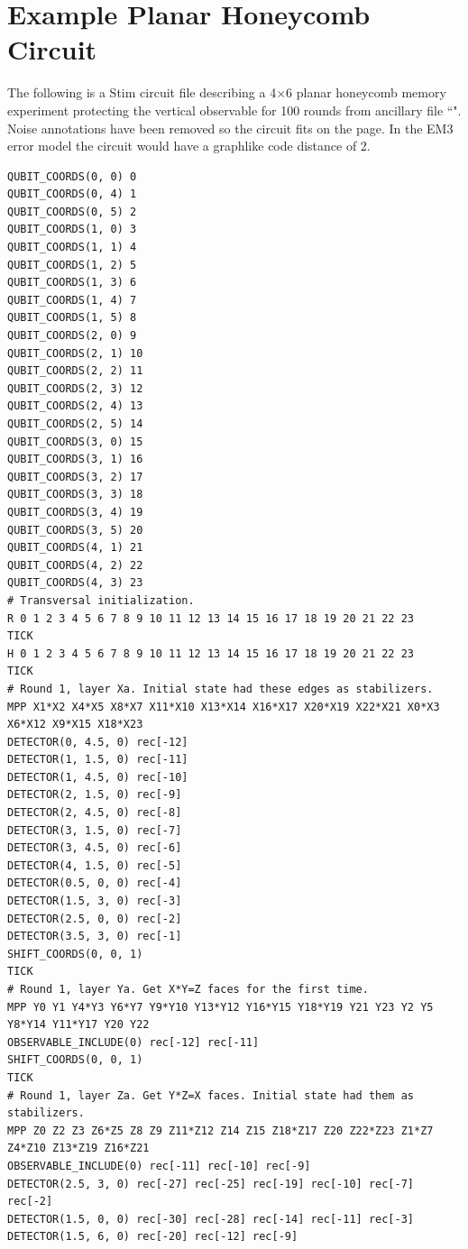 \documentclass[onecolumn,unpublished,a4paper]{quantumarticle}
\theoremstyle{definition}
\theoremstyle{definition}
\theoremstyle{definition}
\begin{document}
\clearpage
\section{Example Planar Honeycomb Circuit}
\label{app:example_circuit}

The following is a Stim circuit file \cite{stimcircuitformat} describing a 4$\times$6 planar honeycomb memory experiment protecting the vertical observable for 100 rounds from ancillary file ``".
Noise annotations have been removed so the circuit fits on the page.
In the EM3 error model the circuit would have a graphlike code distance of 2.

\begin{lstlisting}[style=stimcircuit]
QUBIT_COORDS(0, 0) 0
QUBIT_COORDS(0, 4) 1
QUBIT_COORDS(0, 5) 2
QUBIT_COORDS(1, 0) 3
QUBIT_COORDS(1, 1) 4
QUBIT_COORDS(1, 2) 5
QUBIT_COORDS(1, 3) 6
QUBIT_COORDS(1, 4) 7
QUBIT_COORDS(1, 5) 8
QUBIT_COORDS(2, 0) 9
QUBIT_COORDS(2, 1) 10
QUBIT_COORDS(2, 2) 11
QUBIT_COORDS(2, 3) 12
QUBIT_COORDS(2, 4) 13
QUBIT_COORDS(2, 5) 14
QUBIT_COORDS(3, 0) 15
QUBIT_COORDS(3, 1) 16
QUBIT_COORDS(3, 2) 17
QUBIT_COORDS(3, 3) 18
QUBIT_COORDS(3, 4) 19
QUBIT_COORDS(3, 5) 20
QUBIT_COORDS(4, 1) 21
QUBIT_COORDS(4, 2) 22
QUBIT_COORDS(4, 3) 23
# Transversal initialization.
R 0 1 2 3 4 5 6 7 8 9 10 11 12 13 14 15 16 17 18 19 20 21 22 23
TICK
H 0 1 2 3 4 5 6 7 8 9 10 11 12 13 14 15 16 17 18 19 20 21 22 23
TICK
# Round 1, layer Xa. Initial state had these edges as stabilizers.
MPP X1*X2 X4*X5 X8*X7 X11*X10 X13*X14 X16*X17 X20*X19 X22*X21 X0*X3 X6*X12 X9*X15 X18*X23
DETECTOR(0, 4.5, 0) rec[-12]
DETECTOR(1, 1.5, 0) rec[-11]
DETECTOR(1, 4.5, 0) rec[-10]
DETECTOR(2, 1.5, 0) rec[-9]
DETECTOR(2, 4.5, 0) rec[-8]
DETECTOR(3, 1.5, 0) rec[-7]
DETECTOR(3, 4.5, 0) rec[-6]
DETECTOR(4, 1.5, 0) rec[-5]
DETECTOR(0.5, 0, 0) rec[-4]
DETECTOR(1.5, 3, 0) rec[-3]
DETECTOR(2.5, 0, 0) rec[-2]
DETECTOR(3.5, 3, 0) rec[-1]
SHIFT_COORDS(0, 0, 1)
TICK
# Round 1, layer Ya. Get X*Y=Z faces for the first time.
MPP Y0 Y1 Y4*Y3 Y6*Y7 Y9*Y10 Y13*Y12 Y16*Y15 Y18*Y19 Y21 Y23 Y2 Y5 Y8*Y14 Y11*Y17 Y20 Y22
OBSERVABLE_INCLUDE(0) rec[-12] rec[-11]
SHIFT_COORDS(0, 0, 1)
TICK
# Round 1, layer Za. Get Y*Z=X faces. Initial state had them as stabilizers.
MPP Z0 Z2 Z3 Z6*Z5 Z8 Z9 Z11*Z12 Z14 Z15 Z18*Z17 Z20 Z22*Z23 Z1*Z7 Z4*Z10 Z13*Z19 Z16*Z21
OBSERVABLE_INCLUDE(0) rec[-11] rec[-10] rec[-9]
DETECTOR(2.5, 3, 0) rec[-27] rec[-25] rec[-19] rec[-10] rec[-7] rec[-2]
DETECTOR(1.5, 0, 0) rec[-30] rec[-28] rec[-14] rec[-11] rec[-3]
DETECTOR(1.5, 6, 0) rec[-20] rec[-12] rec[-9]

\end{lstlisting}
\end{document}
